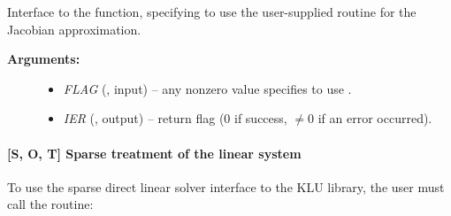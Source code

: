 \documentclass[letterpaper,10pt,english]{sphinxmanual}
\begin{document}
\begin{fulllineitems}
\label{f_interface/Usage:f/_/FARKBANDSETJAC}
Interface to the {\hyperref[c_interface/User_callable:c.ARKDlsSetBandJacFn]{\emph{}}} function, specifying
to use the user-supplied routine {\hyperref[f_interface/Usage:f/_/FARKBJAC]{\emph{}}} for the
Jacobian approximation.
\begin{description}
\item[{\textbf{Arguments:}}] \leavevmode\begin{itemize}
\item {} 
\emph{FLAG} (, input) -- any nonzero value specifies to use
{\hyperref[f_interface/Usage:f/_/FARKBJAC]{\emph{}}}.

\item {} 
\emph{IER} (, output) -- return flag (0 if success,
\(\ne 0\) if an error occurred).

\end{itemize}

\end{description}

\end{fulllineitems}



\paragraph{{[}\textbf{S}, \textbf{O}, \textbf{T}{]} Sparse treatment of the linear system}
\label{f_interface/Usage:s-o-t-sparse-treatment-of-the-linear-system}
To use the sparse direct linear solver interface to the KLU library,
the user must call the {\hyperref[f_interface/Usage:f/_/FARKKLU]{\emph{}}} routine:
\end{document}
